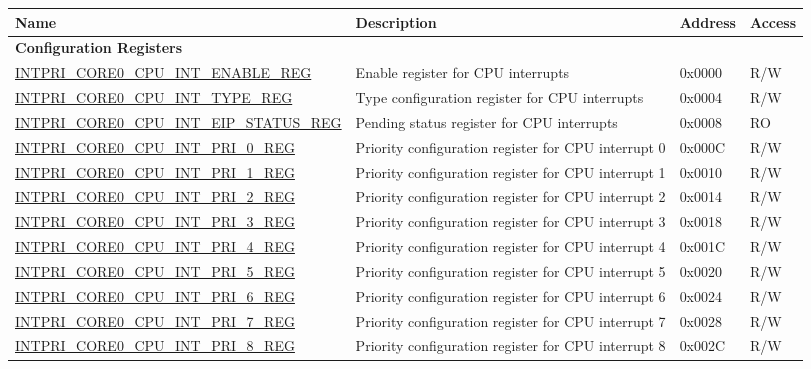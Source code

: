 \begin{longtable}{ | p{10cm} | p{10cm} | p{1.3cm} | p{1cm} | }
\hline\rowcolor{lightgray}
\textbf{Name} & \textbf{Description} &  \textbf{Address} & \textbf{Access} \\ \hline
\endhead
\multicolumn{4}{|l|}{\textbf{Configuration Registers}} \\ \hline
\hyperref[regdesc:INTPRICORE0CPUINTENABLEREG]{INTPRI\_CORE0\_CPU\_INT\_ENABLE\_REG} & Enable register for CPU interrupts & 0x0000 & R/W \\ \hline
\hyperref[regdesc:INTPRICORE0CPUINTTYPEREG]{INTPRI\_CORE0\_CPU\_INT\_TYPE\_REG} & Type configuration register for CPU interrupts & 0x0004 & R/W \\ \hline
\hyperref[regdesc:INTPRICORE0CPUINTEIPSTATUSREG]{INTPRI\_CORE0\_CPU\_INT\_EIP\_STATUS\_REG} & Pending status register for CPU interrupts & 0x0008 & RO \\ \hline
\hyperref[regdesc:INTPRICORE0CPUINTPRINREG]{INTPRI\_CORE0\_CPU\_INT\_PRI\_0\_REG} & Priority configuration register for CPU interrupt 0 & 0x000C & R/W \\ \hline
\hyperref[regdesc:INTPRICORE0CPUINTPRINREG]{INTPRI\_CORE0\_CPU\_INT\_PRI\_1\_REG} & Priority configuration register for CPU interrupt 1 & 0x0010 & R/W \\ \hline
\hyperref[regdesc:INTPRICORE0CPUINTPRINREG]{INTPRI\_CORE0\_CPU\_INT\_PRI\_2\_REG} & Priority configuration register for CPU interrupt 2 & 0x0014 & R/W \\ \hline
\hyperref[regdesc:INTPRICORE0CPUINTPRINREG]{INTPRI\_CORE0\_CPU\_INT\_PRI\_3\_REG} & Priority configuration register for CPU interrupt 3 & 0x0018 & R/W \\ \hline
\hyperref[regdesc:INTPRICORE0CPUINTPRINREG]{INTPRI\_CORE0\_CPU\_INT\_PRI\_4\_REG} & Priority configuration register for CPU interrupt 4 & 0x001C & R/W \\ \hline
\hyperref[regdesc:INTPRICORE0CPUINTPRINREG]{INTPRI\_CORE0\_CPU\_INT\_PRI\_5\_REG} & Priority configuration register for CPU interrupt 5 & 0x0020 & R/W \\ \hline
\hyperref[regdesc:INTPRICORE0CPUINTPRINREG]{INTPRI\_CORE0\_CPU\_INT\_PRI\_6\_REG} & Priority configuration register for CPU interrupt 6 & 0x0024 & R/W \\ \hline
\hyperref[regdesc:INTPRICORE0CPUINTPRINREG]{INTPRI\_CORE0\_CPU\_INT\_PRI\_7\_REG} & Priority configuration register for CPU interrupt 7 & 0x0028 & R/W \\ \hline
\hyperref[regdesc:INTPRICORE0CPUINTPRINREG]{INTPRI\_CORE0\_CPU\_INT\_PRI\_8\_REG} & Priority configuration register for CPU interrupt 8 & 0x002C & R/W \\ \hline

\end{longtable}
